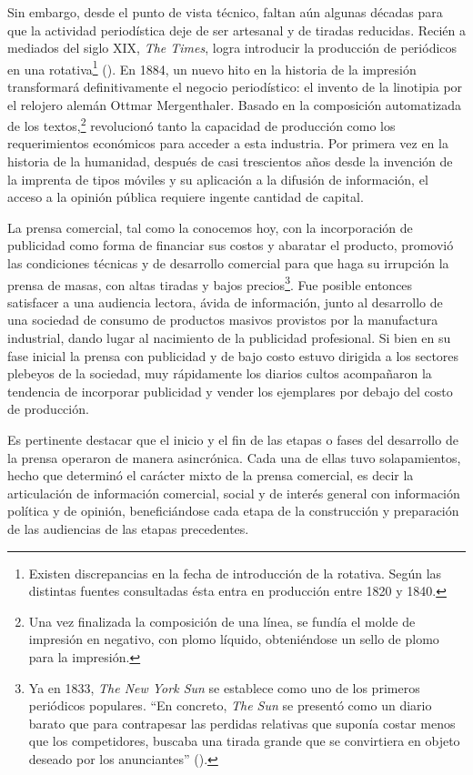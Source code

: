 Sin embargo, desde el punto de vista técnico, faltan aún algunas décadas para que la actividad periodística deje de ser artesanal y de tiradas reducidas. Recién a mediados del siglo XIX, \emph{The Times}, logra introducir la producción de periódicos en una rotativa\footnote{Existen discrepancias en la fecha de introducción de la rotativa. Según las distintas fuentes consultadas ésta entra en producción entre 1820 y 1840.} (\cite{@6968-BARBIER1999}). En 1884, un nuevo hito en la historia de la impresión transformará definitivamente el negocio periodístico: el invento de la linotipia por el relojero alemán Ottmar Mergenthaler. Basado en la composición automatizada de los textos,\footnote{Una vez finalizada la composición de una línea, se fundía el molde de impresión en negativo, con plomo líquido, obteniéndose un sello de plomo para la impresión.} revolucionó tanto la capacidad de producción como los requerimientos económicos para acceder a esta industria. Por primera vez en la historia de la humanidad, después de casi trescientos años desde la invención de la imprenta de tipos móviles y su aplicación a la difusión de información, el acceso a la opinión pública requiere ingente cantidad de capital.

La prensa comercial, tal como la conocemos hoy, con la incorporación de publicidad como forma de financiar sus costos y abaratar el producto, promovió las condiciones técnicas y de desarrollo comercial para que haga su irrupción la prensa de masas, con altas tiradas y bajos precios\footnote{Ya en 1833, \emph{The New York Sun} se establece como uno de los primeros periódicos populares. \enquote{En concreto, \emph{The Sun} se presentó como un diario barato  que para contrapesar las perdidas relativas que suponía costar menos que los competidores, buscaba una tirada grande que se convirtiera en objeto deseado por los anunciantes} (\cite [89]{@6969-BARRERA2004}).}. Fue posible entonces satisfacer a una audiencia lectora, ávida de información, junto al desarrollo de una sociedad de consumo de productos masivos provistos por la manufactura industrial, dando lugar al nacimiento de la publicidad profesional. Si bien en su fase inicial la prensa con publicidad y de bajo costo estuvo dirigida a los sectores plebeyos de la sociedad, muy rápidamente los diarios cultos acompañaron la tendencia de incorporar publicidad y vender los ejemplares por debajo del costo de producción.

Es pertinente destacar que el inicio y el fin de las etapas o fases del desarrollo de la prensa operaron de manera asincrónica. Cada una de ellas tuvo solapamientos, hecho que determinó el carácter mixto de la prensa comercial, es decir la articulación de información comercial, social y de interés general con información política y de opinión, beneficiándose cada etapa de la construcción y preparación de las audiencias de las etapas precedentes.


